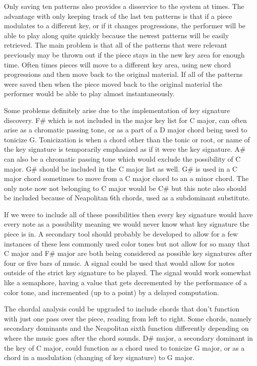 \documentclass[12pt]{ucthesis}
\begin{document}
{Only saving ten patterns also provides a disservice to the system at times. The advantage with only keeping track of the last ten patterns is that if a piece modulates to a different key, or if it changes progressions, the performer will be able to play along quite quickly because the newest patterns will be easily retrieved. The main problem is that all of the patterns that were relevant previously may be thrown out if the piece stays in the new key area for enough time. Often times pieces will move to a different key area, using new chord progressions and then move back to the original material. If all of the patterns were saved then when the piece moved back to the original material the performer would be able to play almost instantaneously. 

Some problems definitely arise due to the implementation of key signature discovery. F\# which is not included in the major key list for C major, can often arise as a chromatic passing tone, or as a part of a D major chord being used to tonicize G. Tonicization is when a chord other than the tonic or root, or name of the key signature is temporarily emphasized as if it were the key signature. A\# can also be a chromatic passing tone which would exclude the possibility of C major. G\# should be included in the C major list as well. G\# is used in a C major chord sometimes to move from a C major chord to an a minor chord. The only note now not belonging to C major would be C\# but this note also should be included because of Neapolitan 6th chords, used as a subdominant substitute.

If we were to include all of these possibilities then every key signature would have every note as a possibility meaning we would never know what key signature the piece is in. A secondary tool should probably be developed to allow for a few instances of these less commonly used color tones but not allow for so many that C major and F\# major are both being considered as possible key signatures after four or five bars of music. A signal could be used that would allow for notes outside of the strict key signature to be played. The signal would work somewhat like a semaphore, having a value that gets decremented by the performance of a color tone, and incremented (up to a point) by a delayed computation. 

The chordal analysis could be upgraded to include chords that don't function with just one pass over the piece, reading from left to right. Some chords, namely secondary dominants and the Neapolitan sixth function differently depending on where the music goes after the chord sounds. D\# major, a secondary dominant in the key of C major, could function as a chord used to tonicize G major, or as a chord in a modulation (changing of key signature) to G major. 

}
\end{document}
